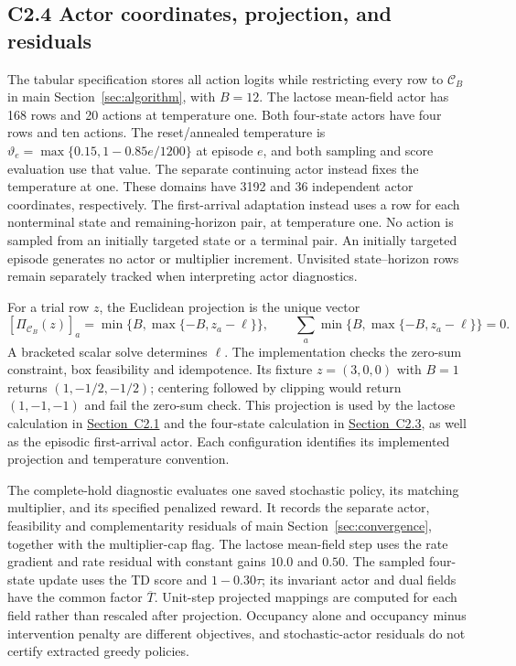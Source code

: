\documentclass[11pt]{article}
\newcommand{\1}{\mathbf{1}}
\newcommand{\Tbar}{\overline{T}}
\newcommand{\proj}{\Pi}
\begin{document}
\subsection*{C2.4 Actor coordinates, projection, and residuals}
\label{comp:sec:actor_geometry}
The tabular specification stores all action logits while restricting every row to $\mathcal C_B$ in main Section~\ref*{sec:algorithm}, with $B=12$. The lactose mean-field actor has 168 rows and 20 actions at temperature one. Both four-state actors have four rows and ten actions. The reset/annealed temperature is $\vartheta_e=\max\{0.15,1-0.85e/1200\}$ at episode $e$, and both sampling and score evaluation use that value. The separate continuing actor instead fixes the temperature at one. These domains have 3192 and 36 independent actor coordinates, respectively. The first-arrival adaptation instead uses a row for each nonterminal state and remaining-horizon pair, at temperature one. No action is sampled from an initially targeted state or a terminal pair. An initially targeted episode generates no actor or multiplier increment. Unvisited state--horizon rows remain separately tracked when interpreting actor diagnostics.

For a trial row $z$, the Euclidean projection is the unique vector
\[
 [\proj_{\mathcal C_B}(z)]_a
 =\min\{B,\max\{-B,z_a-\ell\}\},\qquad
 \sum_a\min\{B,\max\{-B,z_a-\ell\}\}=0.
\]
A bracketed scalar solve determines $\ell$. The implementation checks the zero-sum constraint, box feasibility and idempotence. Its fixture $z=(3,0,0)$ with $B=1$ returns $(1,-1/2,-1/2)$; centering followed by clipping would return $(1,-1,-1)$ and fail the zero-sum check. This projection is used by the lactose calculation in \hyperref[comp:sec:lactose]{Section~C2.1} and the four-state calculation in \hyperref[comp:sec:heterogeneous]{Section~C2.3}, as well as the episodic first-arrival actor. Each configuration identifies its implemented projection and temperature convention.

The complete-hold diagnostic evaluates one saved stochastic policy, its matching multiplier, and its specified penalized reward. It records the separate actor, feasibility and complementarity residuals of main Section~\ref*{sec:convergence}, together with the multiplier-cap flag. The lactose mean-field step uses the rate gradient and rate residual with constant gains $10.0$ and $0.50$. The sampled four-state update uses the TD score and $1-0.30\tau$; its invariant actor and dual fields have the common factor $\Tbar$. Unit-step projected mappings are computed for each field rather than rescaled after projection. Occupancy alone and occupancy minus intervention penalty are different objectives, and stochastic-actor residuals do not certify extracted greedy policies.
\end{document}
